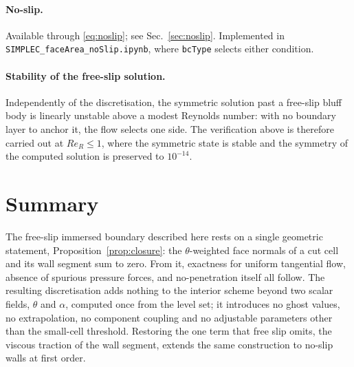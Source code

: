\documentclass[11pt,a4paper]{article}
\theoremstyle{remark}
\begin{document}
\paragraph{No-slip.} Available through \eqref{eq:noslip}; see Sec.~\ref{sec:noslip}.
Implemented in \texttt{SIMPLEC\_faceArea\_noSlip.ipynb}, where \texttt{bcType} selects either
condition.

\paragraph{Stability of the free-slip solution.} Independently of the discretisation, the
symmetric solution past a free-slip bluff body is linearly unstable above a modest Reynolds
number: with no boundary layer to anchor it, the flow selects one side. The verification above
is therefore carried out at $Re_R\le1$, where the symmetric state is stable and the symmetry
of the computed solution is preserved to $10^{-14}$.

\section{Summary}

The free-slip immersed boundary described here rests on a single geometric statement,
Proposition~\ref{prop:closure}: the $\theta$-weighted face normals of a cut cell and its wall
segment sum to zero. From it, exactness for uniform tangential flow, absence of spurious
pressure forces, and no-penetration itself all follow. The resulting discretisation adds
nothing to the interior scheme beyond two scalar fields, $\theta$ and $\alpha$, computed once
from the level set; it introduces no ghost values, no extrapolation, no component coupling and
no adjustable parameters other than the small-cell threshold. Restoring the one term that
free slip omits, the viscous traction of the wall segment, extends the same construction to
no-slip walls at first order.
\end{document}
